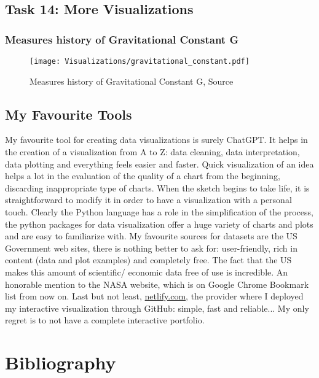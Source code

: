 \documentclass[a4paper,landscape]{article}
\begin{document}
\newpage

\subsection{Task 14: More Visualizations}
\subsubsection{Measures history of Gravitational Constant G}

\begin{figure}[H]
    \centering
    \texttt{[image: Visualizations/gravitational\_constant.pdf]} %
    \caption{Measures history of Gravitational Constant G, Source \cite{wikipedia2025gconst}}
    \label{fig:G}
\end{figure}

\subsection{My Favourite Tools}
My favourite tool for creating data visualizations is surely ChatGPT. It helps in the creation of a visualization from A to Z: data cleaning, data interpretation, data plotting and everything feels easier and faster. Quick visualization of an idea helps a lot in the evaluation of the quality of a chart from the beginning, discarding inappropriate type of charts. When the sketch begins to take life, it is straightforward to modify it in order to have a visualization with a personal touch. Clearly the Python language has a role in the simplification of the process, the python packages for data visualization offer a huge variety of charts and plots and are easy to familiarize with.
My favourite sources for datasets are the US Government web sites, there is nothing better to ask for: user-friendly, rich in content (data and plot examples) and completely free. The fact that the US makes this amount of scientific/ economic data free of use is incredible. An honorable mention to the NASA website, which is on Google Chrome Bookmark list from now on. Last but not least, \href{netlify.com}{netlify.com}, the provider where I deployed my interactive visualization through GitHub: simple, fast and reliable... My only regret is to not have a complete interactive portfolio.

\section{Bibliography}


\end{document}
